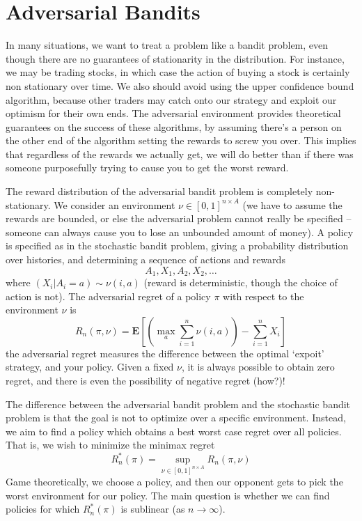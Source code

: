 \chapter{Adversarial Bandits}

In many situations, we want to treat a problem like a bandit problem, even though there are no guarantees of stationarity in the distribution. For instance, we may be trading stocks, in which case the action of buying a stock is certainly non stationary over time. We also should avoid using the upper confidence bound algorithm, because other traders may catch onto our strategy and exploit our optimism for their own ends. The adversarial environment provides theoretical guarantees on the success of these algorithms, by assuming there's a person on the other end of the algorithm setting the rewards to screw you over. This implies that regardless of the rewards we actually get, we will do better than if there was someone purposefully trying to cause you to get the worst reward.

The reward distribution of the adversarial bandit problem is completely non-stationary. We consider an environment $\nu \in [0,1]^{n \times A}$ (we have to assume the rewards are bounded, or else the adversarial problem cannot really be specified -- someone can always cause you to lose an unbounded amount of money). A policy is specified as in the stochastic bandit problem, giving a probability distribution over histories, and determining a sequence of actions and rewards
%
\[ A_1, X_1, A_2, X_2, \dots \]
%
where $(X_i | A_i = a) \sim \nu(i,a)$ (reward is deterministic, though the choice of action is not). The adversarial regret of a policy $\pi$ with respect to the environment $\nu$ is
%
\[ R_n(\pi,\nu) = \mathbf{E} \left[\left( \max_a \sum_{i=1}^n \nu(i,a) \right) - \sum_{i = 1}^n X_i \right] \]
%
the adversarial regret measures the difference between the optimal `expoit' strategy, and your policy. Given a fixed $\nu$, it is always possible to obtain zero regret, and there is even the possibility of negative regret (how?)!

The difference between the adversarial bandit problem and the stochastic bandit problem is that the goal is not to optimize over a specific environment. Instead, we aim to find a policy which obtains a best worst case regret over all policies. That is, we wish to minimize the minimax regret
%
\[ R_n^*(\pi) = \sup_{\nu \in [0,1]^{n \times A}} R_n(\pi, \nu) \]
%
Game theoretically, we choose a policy, and then our opponent gets to pick the worst environment for our policy. The main question is whether we can find policies for which $R_n^*(\pi)$ is sublinear (as $n \to \infty$).

